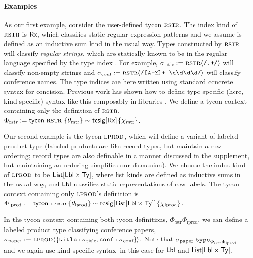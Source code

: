 \documentclass[10pt,preprint]{sigplanconf}
\begin{document}
\paragraph{Examples}
As our first example, consider the user-defined tycon $\textsc{rstr}$. The index kind of $\textsc{rstr}$ is ${\sf Rx}$, which classifies static regular expression patterns and we assume is defined as an inductive sum kind in the usual way. Types constructed by $\textsc{rstr}$ will classify \emph{regular strings}, which are statically known to be in the regular language specified by the type index  \cite{sanitation-psp14}. For example, $\sigma_\text{title} := {\textsc{rstr}}\langle\texttt{/.+/}\rangle$ will classify non-empty strings and $\sigma_\text{conf} := {\textsc{rstr}}\langle\texttt{/[A-Z]+ \textbackslash d\textbackslash d\textbackslash d\textbackslash d/}\rangle$ will classify conference names.  The type indices are  here written using standard concrete syntax for concision. Previous work has shown how to define type-specific (here, kind-specific) syntax like this composably in libraries \cite{TSLs}. We define a tycon context containing only the definition of $\textsc{rstr}$, $\Phi_\text{rstr} := {\sf tycon}~\textsc{rstr} ~\{\theta_\text{rstr}\} \sim {\sf tcsig}[{\sf Rx}]\,\{\chi_\text{rstr}\}$.

Our second example is the tycon $\textsc{lprod}$, which will define a variant of labeled product type (labeled products are like record types, but maintain a row  ordering; record types are also definable in a manner discussed in the supplement, but maintaining an ordering simplifies our discussion). We choose the index kind of $\textsc{lprod}$ to be ${\sf List}[{\sf Lbl} \times {\sf Ty}]$, where list kinds are defined as inductive sums in the usual way, and ${\sf Lbl}$ classifies static representations of row labels. The tycon context containing only $\textsc{lprod}$'s definition is $\small\Phi_\text{lprod} := \tcdef{\tcvar{lprod}}{\tcsig{\klist{\klbl \times \kty}}{\chi_\text{lprod}}}{\theta_\text{lprod}}$.

In the tycon context containing both tycon definitions, $\Phi_\text{rstr}\Phi_\text{lprod}$, we can define a labeled product type classifying conference papers, $\sigma_\text{paper} := {\textsc{lprod}}\langle\{\texttt{title} : \sigma_\text{title}, \texttt{conf} : \sigma_\text{conf}\}\rangle$. Note that $\sigma_\text{paper}~\texttt{type}_{\Phi_\text{rstr}\Phi_\text{lprod}}$ and we again use kind-specific syntax, in this case for ${\sf Lbl}$ and ${\sf List}[{\sf Lbl} \times {\sf Ty}]$.
\end{document}
